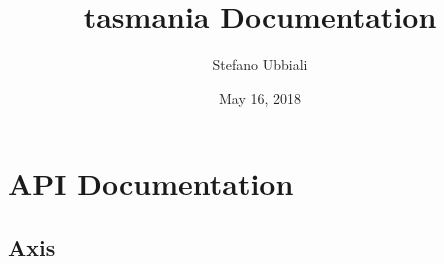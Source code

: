 \documentclass[letterpaper,10pt,english]{sphinxmanual}
\title{tasmania Documentation}
\date{May 16, 2018}
\author{Stefano Ubbiali}
\begin{document}
\maketitle
\sphinxtableofcontents
{}\label{\detokenize{index::doc}}



\chapter{API Documentation}
\label{\detokenize{api::doc}}\label{\detokenize{api:api-documentation}}\label{\detokenize{api:welcome-to-tasmania-s-documentation}}

\section{Axis}
\label{\detokenize{api:axis}}
\end{document}
